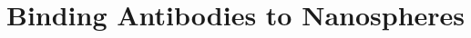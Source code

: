 
\def\mytitle{Chapter 2}

\def\bibliocommand{}
\chapter{Binding Antibodies to Nanospheres}
\label{bindingantibodiestonanospheres}






